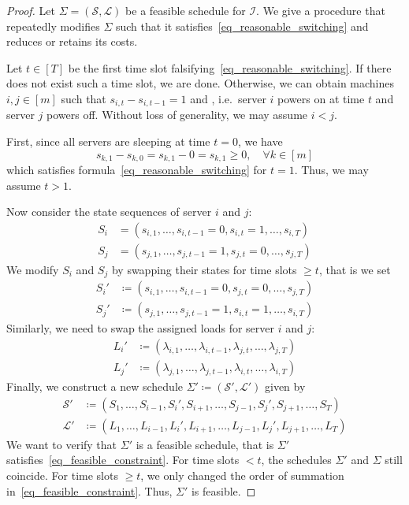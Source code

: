 \documentclass[hidelinks]{article}
\theoremstyle{plain}
\theoremstyle{definition}
\theoremstyle{rem}
\newcommand{\inp}{\mathcal{I}}
\begin{document}
\begin{proof}
Let $\Sigma=(\mathcal{S},\mathcal{L})$ be a feasible schedule for $\inp$. We give a procedure that repeatedly modifies $\Sigma$ such that it satisfies~\eqref{eq_reasonable_switching} and reduces or retains its costs. 
	
Let $t\in[T]$ be the first time slot falsifying~\eqref{eq_reasonable_switching}. If there does not exist such a time slot, we are done. Otherwise, we can obtain machines $i,j\in[m]$ such that $s_{i,t}-s_{i,t-1}=1$ and , i.e.\ server $i$ powers on at time $t$ and server $j$ powers off. Without loss of generality, we may assume $i<j$. 
	
First, since all servers are sleeping at time $t=0$, we have
\begin{equation*}
	s_{k,1}-s_{k,0}=s_{k,1}-0=s_{k,1}\ge 0,\quad\forall k\in[m]
\end{equation*}
which satisfies formula~\eqref{eq_reasonable_switching} for $t=1$.
Thus, we may assume $t>1$. 
	
Now consider the state sequences of server $i$ and $j$:
\begin{align*}
	S_i&=(s_{i,1},\ldots,s_{i,t-1}=0,s_{i,t}=1,\ldots,s_{i,T})\\
	S_j&=(s_{j,1},\ldots,s_{j,t-1}=1,s_{j,t}=0,\ldots,s_{j,T})
\end{align*}
We modify $S_i$ and $S_j$ by swapping their states for time slots $\ge t$, that is we set
\begin{align*}
	S_i'&\coloneqq(s_{i,1},\ldots,s_{i,t-1}=0,s_{j,t}=0,\ldots,s_{j,T})\\
	S_j'&\coloneqq(s_{j,1},\ldots,s_{j,t-1}=1,s_{i,t}=1,\ldots,s_{i,T})
\end{align*}
Similarly, we need to swap the assigned loads for server $i$ and $j$:
\begin{align*}
	L_i'&\coloneqq(\lambda_{i,1},\ldots,\lambda_{i,t-1},\lambda_{j,t},\ldots,\lambda_{j,T})\\
	L_j'&\coloneqq(\lambda_{j,1},\ldots,\lambda_{j,t-1},\lambda_{i,t},\ldots,\lambda_{i,T})
\end{align*}
Finally, we construct a new schedule $\Sigma'\coloneqq(\mathcal{S}',\mathcal{L}')$ given by 
\begin{align*}
	\mathcal{S}'&\coloneqq(S_1,\ldots,S_{i-1},S_i',S_{i+1},\ldots,S_{j-1},S_j',S_{j+1},\ldots,S_T)\\
	\mathcal{L}'&\coloneqq(L_1,\ldots,L_{i-1},L_i',L_{i+1},\ldots,L_{j-1},L_j',L_{j+1},\ldots,L_T)
\end{align*}
We want to verify that $\Sigma'$ is a feasible schedule, that is $\Sigma'$ satisfies~\eqref{eq_feasible_constraint}. For time slots $<t$, the schedules $\Sigma'$ and $\Sigma$ still coincide. For time slots $\ge t$, we only changed the order of summation in~\eqref{eq_feasible_constraint}. Thus, $\Sigma'$ is feasible.


\end{proof}
\end{document}
